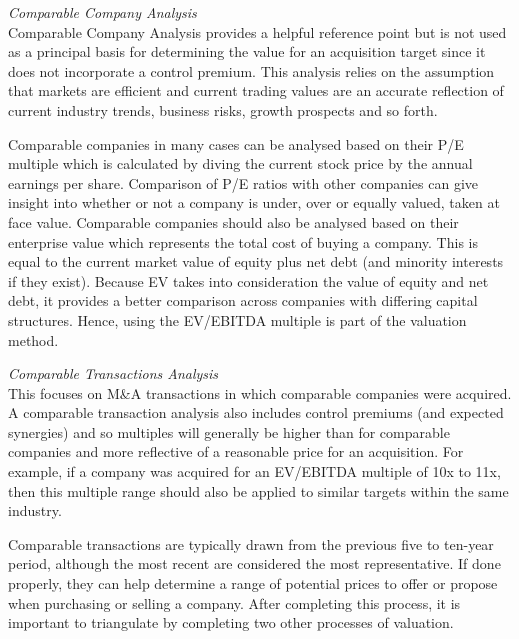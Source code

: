 \documentclass[10pt, a4paper]{article}
\begin{document}
\vspace{10pt}
\noindent \textit{Comparable Company Analysis}\\
Comparable Company Analysis provides a helpful reference point but is not used as a principal basis for determining the value for an acquisition target since it does not incorporate a control premium. This analysis relies on the assumption that markets are efficient and current trading values are an accurate reflection of current industry trends, business risks, growth prospects and so forth. 

\vspace{5pt}
\noindent Comparable companies in many cases can be analysed based on their P/E multiple which is calculated by diving the current stock price by the annual earnings per share. Comparison of P/E ratios with other companies can give insight into whether or not a company is under, over or equally valued, taken at face value. Comparable companies should also be analysed based on their enterprise value which represents the total cost of buying a company. This is equal to the current market value of equity plus net debt (and minority interests if they exist). Because EV takes into consideration the value of equity and net debt, it provides a better comparison across companies with differing capital structures. Hence, using the EV/EBITDA multiple is part of the valuation method.

\vspace{10pt}
\noindent \textit{Comparable Transactions Analysis}\\
This focuses on M\&A transactions in which comparable companies were acquired. A comparable transaction analysis also includes control premiums (and expected synergies) and so multiples will generally be higher than for comparable companies and more reflective of a reasonable price for an acquisition. For example, if a company was acquired for an EV/EBITDA multiple of 10x to 11x, then this multiple range should also be applied to similar targets within the same industry.

\vspace{5pt}
\noindent Comparable transactions are typically drawn from the previous five to ten-year period, although the most recent are considered the most representative. If done properly, they can help determine a range of potential prices to offer or propose when purchasing or selling a company. After completing this process, it is important to triangulate by completing two other processes of valuation.
\end{document}
